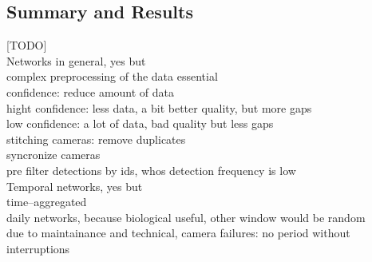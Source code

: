 \subsection{Summary and Results}
[TODO]\\

Networks in general, yes but\\
complex preprocessing of the data essential\\
confidence: reduce amount of data\\
hight confidence: less data, a bit better quality, but more gaps\\
low confidence: a lot of data, bad quality but less gaps\\
stitching cameras: remove duplicates\\
syncronize cameras\\
pre filter detections by ids, whos detection frequency is low\\

Temporal networks, yes but\\
time--aggregated\\
daily networks, because biological useful, other window would be random\\
due to maintainance and technical, camera failures: no period without interruptions\\
